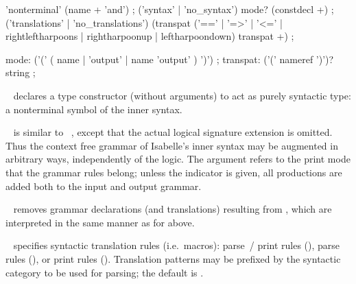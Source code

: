 \begin{isabellebody}
\begin{isamarkuptext}
  \begin{rail}
    'nonterminal' (name + 'and')
    ;
    ('syntax' | 'no_syntax') mode? (constdecl +)
    ;
    ('translations' | 'no_translations') (transpat ('==' | '=>' | '<=' | rightleftharpoons | rightharpoonup | leftharpoondown) transpat +)
    ;

    mode: ('(' ( name | 'output' | name 'output' ) ')')
    ;
    transpat: ('(' nameref ')')? string
    ;
  \end{rail}

  \begin{description}
  
  \item \hyperlink{command.nonterminal}{\mbox{}}~ declares a type
  constructor  (without arguments) to act as purely syntactic
  type: a nonterminal symbol of the inner syntax.

  \item \hyperlink{command.syntax}{\mbox{}}~ is similar to
  \hyperlink{command.consts}{\mbox{}}~, except that the actual logical
  signature extension is omitted.  Thus the context free grammar of
  Isabelle's inner syntax may be augmented in arbitrary ways,
  independently of the logic.  The  argument refers to the
  print mode that the grammar rules belong; unless the \hyperlink{keyword.output}{\mbox{}} indicator is given, all productions are added both to the
  input and output grammar.
  
  \item \hyperlink{command.no-syntax}{\mbox{}}~ removes grammar
  declarations (and translations) resulting from , which
  are interpreted in the same manner as for \hyperlink{command.syntax}{\mbox{}} above.
  
  \item \hyperlink{command.translations}{\mbox{}}~ specifies syntactic
  translation rules (i.e.\ macros): parse~/ print rules (),
  parse rules (), or print rules ().
  Translation patterns may be prefixed by the syntactic category to be
  used for parsing; the default is .
  

\end{description}
\end{isamarkuptext}
\end{isabellebody}
